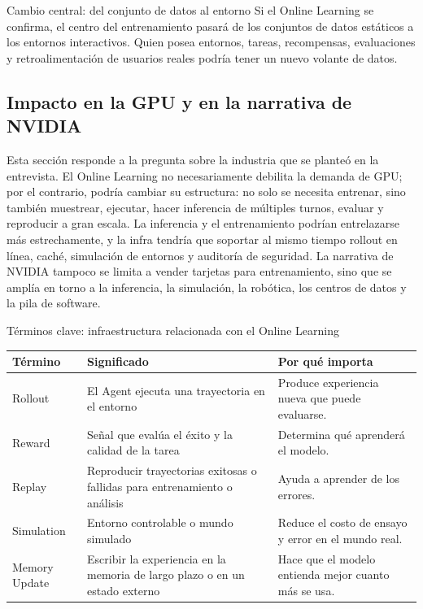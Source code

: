 \begin{importantbox}{Cambio central: del conjunto de datos al entorno}
Si el Online Learning se confirma, el centro del entrenamiento pasará de los conjuntos de datos estáticos a los entornos interactivos. Quien posea entornos, tareas, recompensas, evaluaciones y retroalimentación de usuarios reales podría tener un nuevo volante de datos.
\end{importantbox}

\subsection{Impacto en la GPU y en la narrativa de NVIDIA}

Esta sección responde a la pregunta sobre la industria que se planteó en la entrevista. El Online Learning no necesariamente debilita la demanda de GPU; por el contrario, podría cambiar su estructura: no solo se necesita entrenar, sino también muestrear, ejecutar, hacer inferencia de múltiples turnos, evaluar y reproducir a gran escala. La inferencia y el entrenamiento podrían entrelazarse más estrechamente, y la infra tendría que soportar al mismo tiempo rollout en línea, caché, simulación de entornos y auditoría de seguridad. La narrativa de NVIDIA tampoco se limita a vender tarjetas para entrenamiento, sino que se amplía en torno a la inferencia, la simulación, la robótica, los centros de datos y la pila de software.

\begin{knowledgebox}{Términos clave: infraestructura relacionada con el Online Learning}
\noindent\begin{tabularx}{\textwidth}{p{}p{}X}
\toprule
Término & Significado & Por qué importa \\
\midrule
Rollout & El Agent ejecuta una trayectoria en el entorno & Produce experiencia nueva que puede evaluarse. \\
Reward & Señal que evalúa el éxito y la calidad de la tarea & Determina qué aprenderá el modelo. \\
Replay & Reproducir trayectorias exitosas o fallidas para entrenamiento o análisis & Ayuda a aprender de los errores. \\
Simulation & Entorno controlable o mundo simulado & Reduce el costo de ensayo y error en el mundo real. \\
Memory Update & Escribir la experiencia en la memoria de largo plazo o en un estado externo & Hace que el modelo entienda mejor cuanto más se usa. \\
\bottomrule
\end{tabularx}
\end{knowledgebox}

